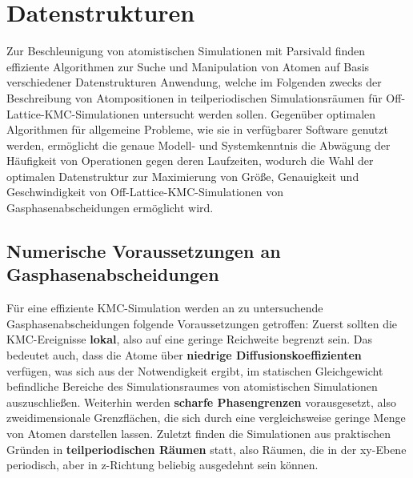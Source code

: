 \section{Datenstrukturen}
\label{datastructures}

Zur Beschleunigung von atomistischen Simulationen mit Parsivald finden effiziente Algorithmen zur Suche und Manipulation von Atomen auf Basis verschiedener Datenstrukturen Anwendung, welche im Folgenden zwecks der Beschreibung von Atompositionen in teilperiodischen Simulationsräumen für Off-Lattice-KMC-Simulationen untersucht werden sollen.
Gegenüber optimalen Algorithmen für allgemeine Probleme, wie sie in verfügbarer Software genutzt werden, ermöglicht die genaue Modell- und Systemkenntnis die Abwägung der Häufigkeit von Operationen gegen deren Laufzeiten,
wodurch die Wahl der optimalen Datenstruktur zur Maximierung von Größe, Genauigkeit und Geschwindigkeit von Off-Lattice-KMC-Simulationen von Gasphasenabscheidungen ermöglicht wird.

\subsection{Numerische Voraussetzungen an Gasphasenabscheidungen}

Für eine effiziente KMC-Simulation werden an zu untersuchende Gasphasenabscheidungen folgende Voraussetzungen getroffen:
Zuerst sollten die KMC-Ereignisse \textbf{lokal}, also auf eine geringe Reichweite begrenzt sein.
Das bedeutet auch, dass die Atome über \textbf{niedrige Diffusionskoeffizienten} verfügen, was sich aus der Notwendigkeit ergibt, im statischen Gleichgewicht befindliche Bereiche des Simulationsraumes von atomistischen Simulationen auszuschließen.
Weiterhin werden \textbf{scharfe Phasengrenzen} vorausgesetzt, also zweidimensionale Grenzflächen, die sich durch eine vergleichsweise geringe Menge von Atomen darstellen lassen.
Zuletzt finden die Simulationen aus praktischen Gründen in \textbf{teilperiodischen Räumen} statt, also Räumen, die in der xy-Ebene periodisch, aber in z-Richtung beliebig ausgedehnt sein können.


